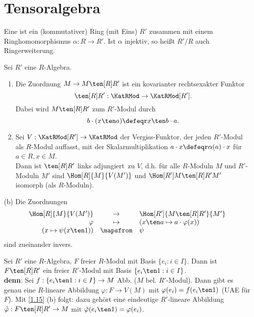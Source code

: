\section{Tensoralgebra}

\begin{Def}
\label{1.14}
Eine  ist ein (kommutativer) Ring (mit Eins) $R'$
zusammen mit einem Ringhomomorphismus $\alpha: R\to R'$.
Ist $\alpha$ injektiv, so hei\ss t $R'/R$ auch Ringerweiterung.
\end{Def}

\begin{Bem}
\label{1.15}
Sei $R'$ eine $R$-Algebra.
\begin{enumerate}
\item Die Zuordnung $M\to M\ten[R] R'$ ist ein kovarianter rechtsexakter Funktor
\[
\ten[R] R':\KatRMod\to \KatRMod[R'].
\]
Dabei wird $M\ten[R] R'$ zum $R'$-Modul durch
\[
b\cdot (x\ten a)\defeqr x\ten b\cdot a.
\]
\item Sei $V: \KatRMod[R']\to \KatRMod$ der \glqq Vergiss-Funktor\grqq, der
jeden $R'$-Modul als 
$R$-Modul auffasst, mit der Skalarmultiplikation $a\cdot x\defeqr\alpha(a)\cdot x$
f\"ur $a\in R, x\in M$.\\
Dann ist $\ten[R] R'$ \glqq links adjungiert\grqq\ zu $V$, d.h. f\"ur alle 
$R$-Moduln $M$ und $R'$-Moduln $M'$ sind $\Hom[R]{M}{V(M')}$ und 
$\Hom[{R'}]{M\ten[R] R'}{M'}$ isomorph (als $R$-Moduln).
\end{enumerate}
\end{Bem}

\begin{Bew}
\item[(b)] Die Zuordnungen $$\begin{array}{rcl}
\Hom[R]{M}{V(M')} & \to & \Hom[R']{M\ten[R] R'}{M'}\\
\varphi & \mapsto & (x\ten a\mapsto a\cdot \varphi(x))\\
(x\mapsto \psi(x\ten 1))&\mapsfrom & \psi \\
\end{array}$$
sind zueinander invers.
\end{Bew}

\begin{nnBsp}
Sei $R'$ eine $R$-Algebra, $F$ freier $R$-Modul mit Basis $\{e_i:i\in I\}$. Dann ist $F\ten[R] R'$ ein freier
$R'$-Modul mit Basis $\{e_i\ten 1:i\in I\}$.\\
\textbf{denn}: Sei $f:\{e_i\ten 1: i\in I\} \to M$ Abb. ($M$ bel. $R'$-Modul).
Dann gibt es genau eine $R$-lineare Abbildung $\varphi: F\to V(M)$ mit $\varphi(e_i)=f(e_i\ten 1)$ (UAE f\"ur $F$).
Mit \ref{1.15} (b) folgt: dazu geh\"ort eine eindeutige $R'$-lineare Abbildung
$\tilde\varphi: F\ten[R] R'\to M$ mit $\tilde\varphi(e_i\ten 1)=\varphi(e_i)$.
\end{nnBsp}

